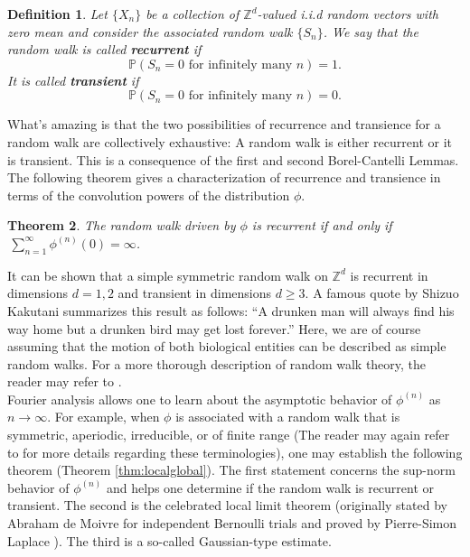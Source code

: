 \documentclass[11pt, letter]{book}
\newtheorem{theorem}{Theorem}[section]
\newtheorem{definition}[theorem]{Definition}
\begin{document}
\begin{framed}
\begin{definition}
Let $\{X_n\}$ be a collection of $\mathbb{Z}^d$-valued i.i.d random vectors with zero mean and consider the associated random walk $\{S_n\}$. We say that the random walk is called \textbf{recurrent} if
\begin{equation*}
    \mathbb{P}(S_n = 0 \text{ for infinitely many } n ) = 1.
\end{equation*}
It is called \textbf{transient} if
\begin{equation*}
    \mathbb{P}(S_n = 0 \text{ for infinitely many } n ) = 0.
\end{equation*}
\end{definition}
\end{framed}
\noindent What's amazing is that the two possibilities of recurrence and transience for a random walk are collectively exhaustive: A random walk is either recurrent or it is transient. This is a consequence of the first and second Borel-Cantelli Lemmas. The following theorem gives a characterization of recurrence and transience in terms of the convolution powers of the distribution $\phi$.

\begin{framed}
\begin{theorem}
The random walk driven by $\phi$ is recurrent if and only if  $\,\sum_{n=1}^\infty \phi^{(n)}(0) = \infty$.
\end{theorem}
\end{framed}



\noindent It can be shown that a simple symmetric random walk on $\mathbb{Z}^d$ is recurrent in dimensions $d = 1, 2$ and transient in dimensions $d \geq 3$. A famous quote by Shizuo Kakutani summarizes this result as follows: ``A drunken man will
always find his way home but a drunken bird may get lost forever.'' Here, we are of course assuming that the motion of both biological entities can be described as simple random walks. For a more thorough description of random walk theory, the reader may refer to \cite{spitzer_principles_1964}.\\



\noindent Fourier analysis allows one to learn about the asymptotic behavior of $\phi^{(n)}$ as $n\to\infty$. For example, when $\phi$ is associated with a random walk that is symmetric, aperiodic, irreducible, or of finite range (The reader may again refer to \cite{spitzer_principles_1964} for more details regarding these terminologies), one may establish the following theorem (Theorem \ref{thm:localglobal}). The first statement concerns the sup-norm behavior of $\phi^{(n)}$ and helps one determine if the random walk is recurrent or transient. The second is the celebrated local limit theorem (originally stated by Abraham de Moivre for independent Bernoulli trials and proved by Pierre-Simon Laplace \cite{mcdonald2005local}). The third is a so-called Gaussian-type estimate.
\end{document}
